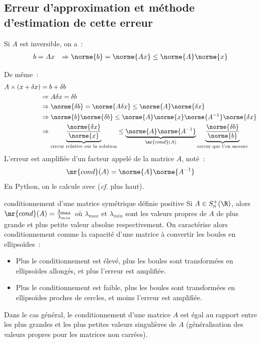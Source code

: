 \subsection{Erreur d'approximation et méthode d'estimation de cette erreur}

Si $A$ est inversible, on a~:
\begin{align*}
    b &= Ax
    &\Rightarrow \norme{b} &= \norme{Ax} \leq \norme{A}\norme{x}\\
\end{align*}

De même~:
\begin{align*}
    A \times (x + \delta x) &= b + \delta b \\
    &\Rightarrow A \delta x = \delta b\\
    &\Rightarrow \norme{\delta b} = \norme{A \delta x} \leq \norme{A}\norme{\delta x}\\
    &\Rightarrow \norme{b} \norme{\delta b} \leq \norme{A}\norme{x} \norme{A^{-1}}\norme{\delta x}\\
    &\Rightarrow \underbrace{\frac{\norme{\delta x}}{\norme{x}}}_{\text{erreur relative sur la solution}} \leq \underbrace{\norme{A}\norme{A^{-1}}}_{\mr{cond}(A)} \underbrace{\frac{\norme{\delta b}}{\norme{b}}}_{\text{erreur que l'on mesure}}\\
\end{align*}
L'erreur est amplifiée d'un facteur appelé  de la matrice $A$, noté~:
$$\mr{cond}(A) = \norme{A}\norme{A^{-1}}$$
En Python, on le calcule avec  (\textit{cf.} plus haut).

\begin{remarque}{}{conditionnement d'une matrice symétrique définie positive}
    Si $A \in S_n^+(\R)$, alors $\mr{cond}(A) = \frac{\lambda_{max}}{\lambda_{min}}$ où $\lambda_{max}$ et $\lambda_{min}$ sont les valeurs propres de $A$ de plus grande et plus petite valeur absolue respectivement. On caractérise alors conditionnement comme la capacité d'une matrice à convertir les boules en ellipsoïdes~:
    \begin{itemize}
        \item Plus le conditionnement est élevé, plus les boules sont transformées en ellipsoïdes allongés, et plus l'erreur est amplifiée.
        \item Plus le conditionnement est faible, plus les boules sont transformées en ellipsoïdes proches de cercles, et moins l'erreur est amplifiée.
    \end{itemize}

    Dans le cas général, le conditionnement d'une matrice $A$ est égal au rapport entre les plus grandes et les plus petites valeurs singulières de $A$ (généralisation des valeurs propres pour les matrices non carrées).
\end{remarque}

